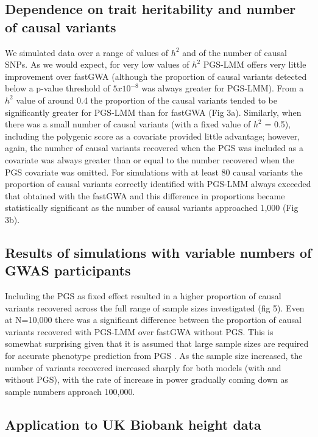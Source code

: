 \documentclass[doublespacing]{bmcart}
\begin{document}
\subsection*{Dependence on trait heritability and number of causal variants}
We simulated data over a range of values of $h^2$ and of the number of causal SNPs. As we would expect, for very low values of $h^2$ PGS-LMM offers very little improvement over fastGWA (although the proportion of causal variants detected below a p-value threshold of $5x10^{-8}$ was always greater for PGS-LMM). From a $h^2$ value of around 0.4 the proportion of the causal variants tended to be significantly greater for PGS-LMM than for fastGWA (Fig 3a). Similarly, when there was a small number of causal variants (with a fixed value of $h^2$ = 0.5), including the polygenic score as a covariate provided little advantage; however, again, the number of causal variants recovered when the PGS was included as a covariate was always greater than or equal to the number recovered when the PGS covariate was omitted. For simulations with at least 80 causal variants the proportion of causal variants correctly identified with PGS-LMM always exceeded that obtained with the fastGWA and this difference in proportions became statistically significant as the number of causal variants approached 1,000 (Fig 3b).

\subsection*{Results of simulations with variable numbers of GWAS participants}
Including the PGS as fixed effect resulted in a higher proportion of causal variants recovered across the full range of sample sizes investigated (fig 5). Even at N=10,000 there was a significant difference between the proportion of causal variants recovered with PGS-LMM over fastGWA without PGS. This is somewhat surprising given that it is assumed that large sample sizes are required for accurate phenotype prediction from PGS \cite{dudbridge2013power}. As the sample size increased, the number of variants recovered increased sharply for both models (with and without PGS), with the rate of increase in power gradually coming down as sample numbers approach 100,000. 

\subsection*{Application to UK Biobank height data} 
\end{document}
